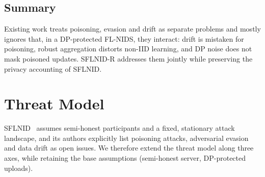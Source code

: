 \documentclass[journal]{IEEEtran}
\begin{document}
\subsection{Summary}
Existing work treats poisoning, evasion and drift as separate problems and mostly ignores that, in a DP-protected FL-NIDS, they interact: drift is mistaken for poisoning, robust aggregation distorts non-IID learning, and DP noise does not mask poisoned updates. SFLNID-R addresses them jointly while preserving the privacy accounting of SFLNID.

\section{Threat Model}
SFLNID~\cite{sflnid} assumes semi-honest participants and a fixed, stationary attack landscape, and its authors explicitly list poisoning attacks, adversarial evasion and data drift as open issues. We therefore extend the threat model along three axes, while retaining the base assumptions (semi-honest server, DP-protected uploads).
\end{document}
